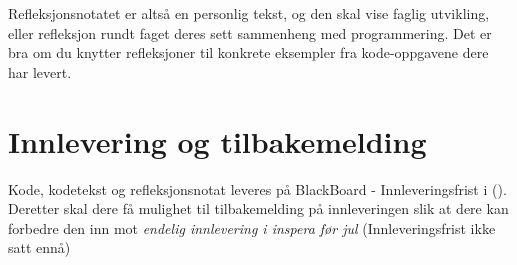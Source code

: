 \documentclass[12pt, titlepage]{article}
\begin{document}
Refleksjonsnotatet er altså en personlig tekst, og den skal vise faglig utvikling, eller refleksjon rundt faget deres sett sammenheng med programmering.
Det er bra om du knytter refleksjoner til konkrete eksempler fra kode-oppgavene dere har levert.

\section*{Innlevering og tilbakemelding}

Kode, kodetekst og refleksjonsnotat leveres på BlackBoard - Innleveringsfrist i (\color{blue}{slutten av uke 41?}\color{black}).
Deretter skal dere få mulighet til tilbakemelding på innleveringen slik at dere kan forbedre den inn mot \textit{endelig innlevering i inspera før jul} (Innleveringsfrist ikke satt ennå)
\end{document}
